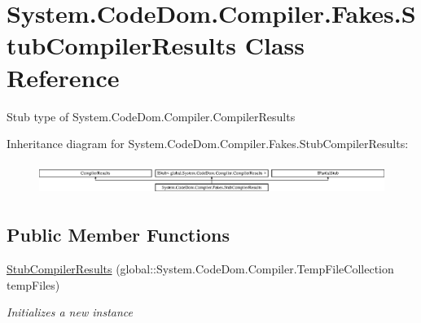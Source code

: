\hypertarget{class_system_1_1_code_dom_1_1_compiler_1_1_fakes_1_1_stub_compiler_results}{\section{System.\-Code\-Dom.\-Compiler.\-Fakes.\-Stub\-Compiler\-Results Class Reference}
\label{class_system_1_1_code_dom_1_1_compiler_1_1_fakes_1_1_stub_compiler_results}
}


Stub type of System.\-Code\-Dom.\-Compiler.\-Compiler\-Results 


Inheritance diagram for System.\-Code\-Dom.\-Compiler.\-Fakes.\-Stub\-Compiler\-Results\-:\begin{figure}[H]
\begin{center}
\leavevmode
\includegraphics[height=1.045752cm]{class_system_1_1_code_dom_1_1_compiler_1_1_fakes_1_1_stub_compiler_results}
\end{center}
\end{figure}
\subsection*{Public Member Functions}
\begin{DoxyCompactItemize}
\item 
\hyperlink{class_system_1_1_code_dom_1_1_compiler_1_1_fakes_1_1_stub_compiler_results_a97ccdcd24f023f612ef83ee44155be94}{Stub\-Compiler\-Results} (global\-::\-System.\-Code\-Dom.\-Compiler.\-Temp\-File\-Collection temp\-Files)
\begin{DoxyCompactList}\small\item\em Initializes a new instance\end{DoxyCompactList}\end{DoxyCompactItemize}
